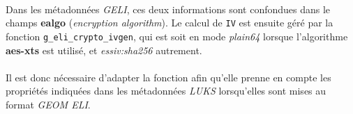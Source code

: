 \paragraph{}
Dans les métadonnées \textit{GELI}, ces deux informations sont confondues dans
le champs \textbf{ealgo} (\textit{encryption algorithm}). Le calcul de
\texttt{IV} est ensuite géré par la fonction \texttt{g\_eli\_crypto\_ivgen}, qui
est soit en mode \textit{plain64} lorsque l'algorithme \textbf{aes-xts} est
utilisé, et \textit{essiv:sha256} autrement.
\paragraph{}
Il est donc nécessaire d'adapter la fonction afin qu'elle prenne en compte les
propriétés indiquées dans les métadonnées \textit{LUKS} lorsqu'elles sont mises
au format \textit{GEOM ELI}.